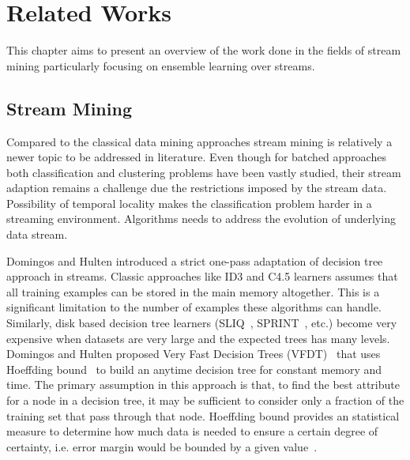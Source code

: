 \chapter{Related Works}
\label{chp:relworks}
This chapter aims to present an overview of the work done in the fields of stream mining particularly focusing on ensemble learning over streams.

\section{Stream Mining}
Compared to the classical data mining approaches stream mining is relatively a newer topic to be addressed in literature. Even though for batched approaches both classification and clustering problems have been vastly studied, their stream adaption remains a challenge due the restrictions imposed by the stream data. Possibility of temporal locality makes the classification problem harder in a streaming environment. Algorithms needs to address the evolution of underlying data stream. 

Domingos and Hulten introduced a strict one-pass adaptation of decision tree~\cite{breiman84:dt,quinlan93:c45} approach in streams. Classic approaches like ID3 and C4.5 learners assumes that all training examples can be stored in the main memory altogether. This is a significant limitation to the number of examples these algorithms can handle. Similarly, disk based decision tree learners (SLIQ~\cite{mehta96:sliq}, SPRINT~\cite{shafer96:sprint}, etc.) become very expensive when datasets are very large and the expected trees has many levels. Domingos and Hulten proposed Very Fast Decision Trees (VFDT)~\cite{domingos00:vfdt} that uses Hoeffding bound~\cite{hoeffding63:bound} to build an anytime decision tree for constant memory and time. The primary assumption in this approach is that, to find the best attribute for a node in a decision tree, it may be sufficient to consider only a fraction of the training set that pass through that node. Hoeffding bound provides an statistical measure to determine how much data is needed to ensure a certain degree of certainty, i.e. error margin would be bounded by a given value~\cite{catlett91:thesis}.

